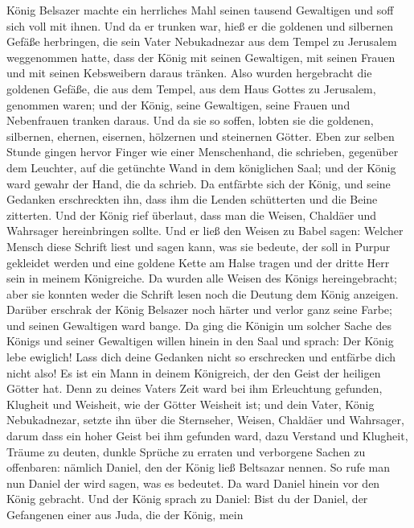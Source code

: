  König Belsazer machte ein herrliches Mahl seinen tausend
Gewaltigen und soff sich voll mit ihnen.  Und da er
trunken war, hieß er die goldenen und silbernen Gefäße herbringen, die
sein Vater Nebukadnezar aus dem Tempel zu Jerusalem weggenommen hatte,
dass der König mit seinen Gewaltigen, mit seinen Frauen und mit seinen
Kebsweibern daraus tränken.  Also wurden hergebracht die
goldenen Gefäße, die aus dem Tempel, aus dem Haus Gottes zu Jerusalem,
genommen waren; und der König, seine Gewaltigen, seine Frauen und
Nebenfrauen tranken daraus.  Und da sie so soffen, lobten
sie die goldenen, silbernen, ehernen, eisernen, hölzernen und steinernen
Götter.  Eben zur selben Stunde gingen hervor Finger wie
einer Menschenhand, die schrieben, gegenüber dem Leuchter, auf die
getünchte Wand in dem königlichen Saal; und der König ward gewahr der
Hand, die da schrieb.  Da entfärbte sich der König, und
seine Gedanken erschreckten ihn, dass ihm die Lenden schütterten und die
Beine zitterten.  Und der König rief überlaut, dass man
die Weisen, Chaldäer und Wahrsager hereinbringen sollte. Und er ließ den
Weisen zu Babel sagen: Welcher Mensch diese Schrift liest und sagen
kann, was sie bedeute, der soll in Purpur gekleidet werden und eine
goldene Kette am Halse tragen und der dritte Herr sein in meinem
Königreiche.  Da wurden alle Weisen des Königs
hereingebracht; aber sie konnten weder die Schrift lesen noch die
Deutung dem König anzeigen.  Darüber erschrak der König
Belsazer noch härter und verlor ganz seine Farbe; und seinen Gewaltigen
ward bange.  Da ging die Königin um solcher Sache des
Königs und seiner Gewaltigen willen hinein in den Saal und sprach: Der
König lebe ewiglich! Lass dich deine Gedanken nicht so erschrecken und
entfärbe dich nicht also!  Es ist ein Mann in deinem
Königreich, der den Geist der heiligen Götter hat. Denn zu deines Vaters
Zeit ward bei ihm Erleuchtung gefunden, Klugheit und Weisheit, wie der
Götter Weisheit ist; und dein Vater, König Nebukadnezar, setzte ihn über
die Sternseher, Weisen, Chaldäer und Wahrsager,  darum
dass ein hoher Geist bei ihm gefunden ward, dazu Verstand und Klugheit,
Träume zu deuten, dunkle Sprüche zu erraten und verborgene Sachen zu
offenbaren: nämlich Daniel, den der König ließ Beltsazar nennen. So rufe
man nun Daniel der wird sagen, was es bedeutet.  Da ward
Daniel hinein vor den König gebracht. Und der König sprach zu Daniel:
Bist du der Daniel, der Gefangenen einer aus Juda, die der König, mein
